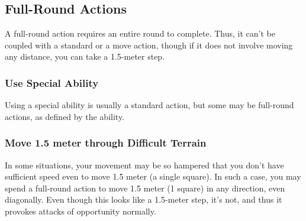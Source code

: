 \subsection{Full-Round Actions}


A full-round action requires an entire round to complete. Thus, it can't be coupled with a standard or a move action, though if it does not involve moving any distance, you can take a 1.5-meter step.




\subsubsection{Use Special Ability}
Using a special ability is usually a standard action, but some may be full-round actions, as defined by the ability.




\subsubsection{Move 1.5 meter through Difficult Terrain}
In some situations, your movement may be so hampered that you don't have sufficient speed even to move 1.5 meter (a single square). In such a case, you may spend a full-round action to move 1.5 meter (1 square) in any direction, even diagonally. Even though this looks like a 1.5-meter step, it's not, and thus it provokes attacks of opportunity normally.